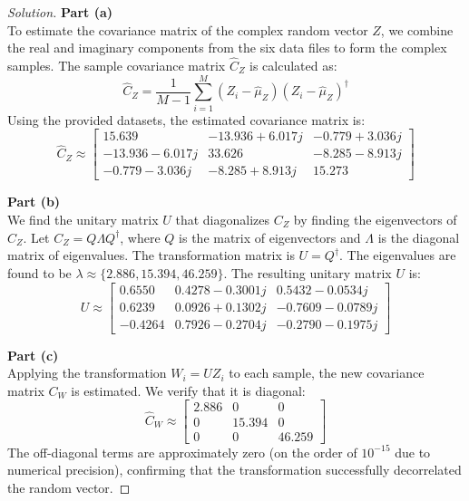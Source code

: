 \documentclass{article}
\begin{document}
\begin{proof}[Solution]
	\textbf{Part (a)}\\
	To estimate the covariance matrix of the complex random vector $Z$, we combine the real and imaginary components from the six data files to form the complex samples. The sample covariance matrix $\hat{C}_Z$ is calculated as:
	\[ \hat{C}_Z = \frac{1}{M-1} \sum_{i=1}^{M} (Z_i - \hat{\mu}_Z)(Z_i - \hat{\mu}_Z)^\dagger \]
	Using the provided datasets, the estimated covariance matrix is:
	\[ \hat{C}_Z \approx \begin{bmatrix} 15.639 & -13.936 + 6.017j & -0.779 + 3.036j \\ -13.936 - 6.017j & 33.626 & -8.285 - 8.913j \\ -0.779 - 3.036j & -8.285 + 8.913j & 15.273 \end{bmatrix} \]
	
	\textbf{Part (b)}\\
	We find the unitary matrix $U$ that diagonalizes $C_Z$ by finding the eigenvectors of $\hat{C}_Z$. Let $C_Z = Q \Lambda Q^\dagger$, where $Q$ is the matrix of eigenvectors and $\Lambda$ is the diagonal matrix of eigenvalues. The transformation matrix is $U = Q^\dagger$. 
	The eigenvalues are found to be $\lambda \approx \{2.886, 15.394, 46.259\}$. The resulting unitary matrix $U$ is:
	\[ U \approx \begin{bmatrix} 0.6550 & 0.4278 - 0.3001j & 0.5432 - 0.0534j \\ 0.6239 & 0.0926 + 0.1302j & -0.7609 - 0.0789j \\ -0.4264 & 0.7926 - 0.2704j & -0.2790 - 0.1975j \end{bmatrix} \]
	
	\textbf{Part (c)}\\
	Applying the transformation $W_i = U Z_i$ to each sample, the new covariance matrix $C_W$ is estimated. We verify that it is diagonal:
	\[ \hat{C}_W \approx \begin{bmatrix} 2.886 & 0 & 0 \\ 0 & 15.394 & 0 \\ 0 & 0 & 46.259 \end{bmatrix} \]
	The off-diagonal terms are approximately zero (on the order of $10^{-15}$ due to numerical precision), confirming that the transformation successfully decorrelated the random vector.
\end{proof}
\end{document}
